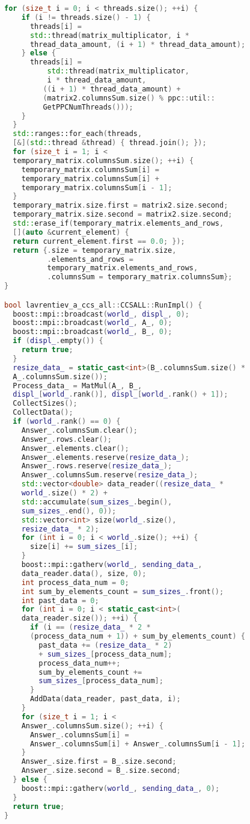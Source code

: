 \documentclass[12pt]{article}
\begin{document}
\begin{lstlisting}[language=C++]
  for (size_t i = 0; i < threads.size(); ++i) {
    if (i != threads.size() - 1) {
      threads[i] = 
      std::thread(matrix_multiplicator, i * 
      thread_data_amount, (i + 1) * thread_data_amount);
    } else {
      threads[i] =
          std::thread(matrix_multiplicator,
          i * thread_data_amount,
         ((i + 1) * thread_data_amount) + 
         (matrix2.columnsSum.size() % ppc::util::
         GetPPCNumThreads()));
    }
  }
  std::ranges::for_each(threads, 
  [&](std::thread &thread) { thread.join(); });
  for (size_t i = 1; i < 
  temporary_matrix.columnsSum.size(); ++i) {
    temporary_matrix.columnsSum[i] = 
    temporary_matrix.columnsSum[i] + 
    temporary_matrix.columnsSum[i - 1];
  }
  temporary_matrix.size.first = matrix2.size.second;
  temporary_matrix.size.second = matrix2.size.second;
  std::erase_if(temporary_matrix.elements_and_rows,
  [](auto &current_element) { 
  return current_element.first == 0.0; });
  return {.size = temporary_matrix.size,
          .elements_and_rows =
          temporary_matrix.elements_and_rows,
          .columnsSum = temporary_matrix.columnsSum};
}

bool lavrentiev_a_ccs_all::CCSALL::RunImpl() {
  boost::mpi::broadcast(world_, displ_, 0);
  boost::mpi::broadcast(world_, A_, 0);
  boost::mpi::broadcast(world_, B_, 0);
  if (displ_.empty()) {
    return true;
  }
  resize_data_ = static_cast<int>(B_.columnsSum.size() * 
  A_.columnsSum.size());
  Process_data_ = MatMul(A_, B_, 
  displ_[world_.rank()], displ_[world_.rank() + 1]);
  CollectSizes();
  CollectData();
  if (world_.rank() == 0) {
    Answer_.columnsSum.clear();
    Answer_.rows.clear();
    Answer_.elements.clear();
    Answer_.elements.reserve(resize_data_);
    Answer_.rows.reserve(resize_data_);
    Answer_.columnsSum.reserve(resize_data_);
    std::vector<double> data_reader((resize_data_ *
    world_.size() * 2) +
    std::accumulate(sum_sizes_.begin(), 
    sum_sizes_.end(), 0));
    std::vector<int> size(world_.size(), 
    resize_data_ * 2);
    for (int i = 0; i < world_.size(); ++i) {
      size[i] += sum_sizes_[i];
    }
    boost::mpi::gatherv(world_, sending_data_, 
    data_reader.data(), size, 0);
    int process_data_num = 0;
    int sum_by_elements_count = sum_sizes_.front();
    int past_data = 0;
    for (int i = 0; i < static_cast<int>(
    data_reader.size()); ++i) {
      if (i == (resize_data_ * 2 * 
      (process_data_num + 1)) + sum_by_elements_count) {
        past_data += (resize_data_ * 2)
        + sum_sizes_[process_data_num];
        process_data_num++;
        sum_by_elements_count +=
        sum_sizes_[process_data_num];
      }
      AddData(data_reader, past_data, i);
    }
    for (size_t i = 1; i <
    Answer_.columnsSum.size(); ++i) {
      Answer_.columnsSum[i] =
      Answer_.columnsSum[i] + Answer_.columnsSum[i - 1];
    }
    Answer_.size.first = B_.size.second;
    Answer_.size.second = B_.size.second;
  } else {
    boost::mpi::gatherv(world_, sending_data_, 0);
  }
  return true;
}
\end{lstlisting}
\end{document}
